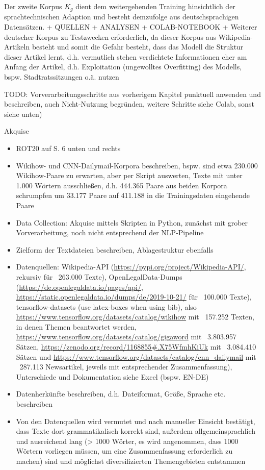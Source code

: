 Der zweite Korpus $K_g$ dient dem weitergehenden Training hinsichtlich der sprachtechnischen Adaption und besteht demzufolge aus deutschsprachigen Datensätzen.
+ QUELLEN + ANALYSEN + COLAB-NOTEBOOK
+ Weiterer deutscher Korpus zu Testzwecken erforderlich, da dieser Korpus aus Wikipedia-Artikeln besteht und somit die Gefahr besteht, dass das Modell die Struktur dieser Artikel lernt, d.h. vermutlich stehen verdichtete Informationen eher am Anfang der Artikel, d.h. Exploitation (ungewolltes Overfitting) des Modells, bspw. Stadtratssitzungen o.ä. nutzen

\noindent
TODO: Vorverarbeitungsschritte aus vorherigem Kapitel punktuell anwenden und beschreiben, auch Nicht-Nutzung begründen, weitere Schritte siehe Colab, sonst siehe unten)


Akquise
\begin{itemize}
	\item ROT20 auf S. 6 unten und rechts
	\item Wikihow- und CNN-Dailymail-Korpora beschreiben, bspw. sind etwa 230.000 Wikihow-Paare zu erwarten, aber per Skript auswerten, Texte mit unter 1.000 Wörtern ausschließen, d.h. 444.365 Paare aus beiden Korpora schrumpfen um 33.177 Paare auf 411.188 in die Trainingsdaten eingehende Paare
	\item Data Collection: Akquise mittels Skripten in Python, zunächst mit grober Vorverarbeitung, noch nicht entsprechend der NLP-Pipeline
	\item Zielform der Textdateien beschreiben, Ablagestruktur ebenfalls
	\item Datenquellen: Wikipedia-API (\url{https://pypi.org/project/Wikipedia-API/}, rekursiv für ~263.000 Texte), OpenLegalData-Dumps (\url{https://de.openlegaldata.io/pages/api/}, \url{https://static.openlegaldata.io/dumps/de/2019-10-21/} für ~100.000 Texte), tensorflow-datasets (use latex-boxes when using bib), also \url{https://www.tensorflow.org/datasets/catalog/wikihow} mit ~157.252 Texten, in denen Themen beantwortet werden, \url{https://www.tensorflow.org/datasets/catalog/gigaword} mit ~3.803.957 Sätzen, \url{https://zenodo.org/record/1168855#.X75WfmhKiUk} mit ~3.084.410 Sätzen und \url{https://www.tensorflow.org/datasets/catalog/cnn_dailymail} mit ~287.113 Newsartikel, jeweils mit entsprechender Zusammenfassung), Unterschiede und Dokumentation siehe Excel (bspw. EN-DE)
	\item Datenherkünfte beschreiben, d.h. Dateiformat, Größe, Sprache etc. beschreiben
	\item Von den Datenquellen wird vermutet und nach manueller Einsicht bestätigt, dass Texte dort grammatikalisch korrekt sind, außerdem allgemeinsprachlich und ausreichend lang (> 1000 Wörter, es wird angenommen, dass 1000 Wörtern vorliegen müssen, um eine Zusammenfassung erforderlich zu machen) sind und möglichst diversifizierten Themengebieten entstammen

\end{itemize}
